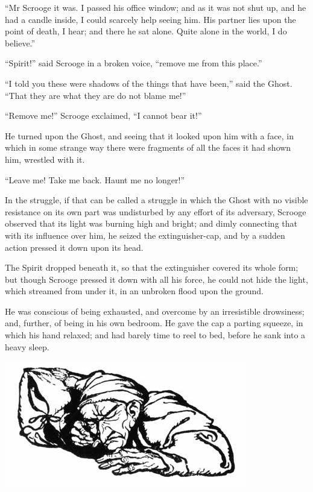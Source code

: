 \documentclass[paper=5.5in:8.5in,BCOR=5mm,twoside,DIV=calc,12pt,usegeometry]{scrbook} %
\begin{document}
\enquote{Mr Scrooge it was. I passed his office window; and as it was not shut up, and he had a candle inside, I could scarcely help seeing him. His partner lies upon the point of death, I hear; and there he sat alone. Quite alone in the world, I do believe.}

\enquote{Spirit!} said Scrooge in a broken voice, \enquote{remove me from this place.}

\enquote{I told you these were shadows of the things that have been,} said the Ghost. \enquote{That they are what they are do not blame me!}

\enquote{Remove me!} Scrooge exclaimed, \enquote{I cannot bear it!}

He turned upon the Ghost, and seeing that it looked upon him with a face, in which in some strange way there were fragments of all the faces it had shown him, wrestled with it.

\enquote{Leave me! Take me back. Haunt me no longer!}

In the struggle, if that can be called a struggle in which the Ghost with no visible resistance on its own part was undisturbed by any effort of its adversary, Scrooge observed that its light was burning high and bright; and dimly connecting that with its influence over him, he seized the extinguisher-cap, and by a sudden action pressed it down upon its head.

The Spirit dropped beneath it, so that the extinguisher covered its whole form; but though Scrooge pressed it down with all his force, he could not hide the light, which streamed from under it, in an unbroken flood upon the ground.

He was conscious of being exhausted, and overcome by an irresistible drowsiness; and, further, of being in his own bedroom. He gave the cap a parting squeeze, in which his hand relaxed; and had barely time to reel to bed, before he sank into a heavy sleep.

\begin{minipage}[c]{\linewidth}
\includegraphics[width=.8\linewidth]{gs090}
\end{minipage}
\end{document}

